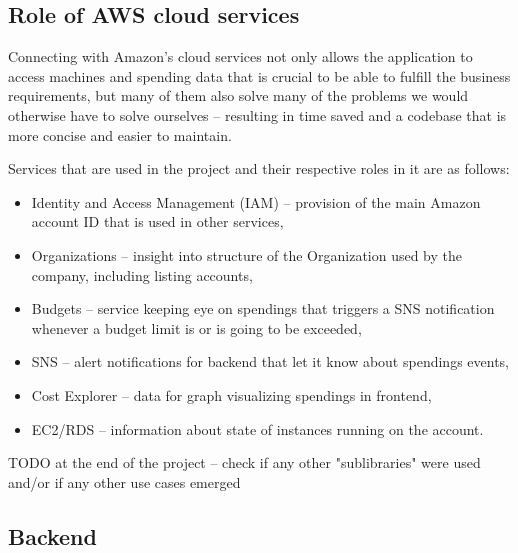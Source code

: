 \documentclass[licencjacka,en]{thesisclass}
\begin{document}
    \subsection{Role of AWS cloud services}
    Connecting with Amazon's cloud services not only allows the application to access machines and spending data
    that is crucial to be able to fulfill the business requirements,
    but many of them also solve many of the problems we would otherwise have to solve ourselves -- resulting
    in time saved and a codebase that is more concise and easier to maintain.

    Services that are used in the project and their respective roles in it are as follows:
    \begin{itemize}
        \item Identity and Access Management (IAM) -- provision of the main Amazon account ID that is used in other services,
        \item Organizations -- insight into structure of the Organization used by the company, including listing accounts,
        \item Budgets -- service keeping eye on spendings that triggers a SNS notification whenever a budget limit is or is going to be exceeded,
        \item SNS -- alert notifications for backend that let it know about spendings events,
        \item Cost Explorer -- data for graph visualizing spendings in frontend,
        \item EC2/RDS -- information about state of instances running on the account.
    \end{itemize}

    TODO at the end of the project -- check if any other "sublibraries" were used and/or if any other use cases emerged

    \subsection{Backend}
\end{document}
